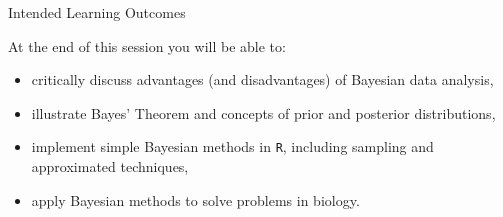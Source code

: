 
\begin{frame}{Intended Learning Outcomes}

	At the end of this session you will be able to:
	\begin{itemize}
		\item critically discuss advantages (and disadvantages) of Bayesian data analysis,
		\item illustrate Bayes' Theorem and concepts of prior and posterior distributions,
		\item implement simple Bayesian methods in \texttt{R}, including sampling and approximated techniques,
		\item apply Bayesian methods to solve problems in biology.
	\end{itemize}

\end{frame}



